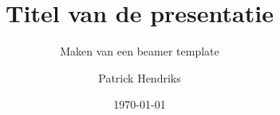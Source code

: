 \documentclass[aspectratio=43]{beamer}
\title{Titel van de presentatie}
\subtitle{Maken van een beamer template}
\date{\today}
\author[Patrick Hendriks]{Patrick Hendriks}
\begin{document}
\begin{frame}[plain]
\titlepage
\end{frame}

\begin{frame}
\end{frame}
\end{document}
